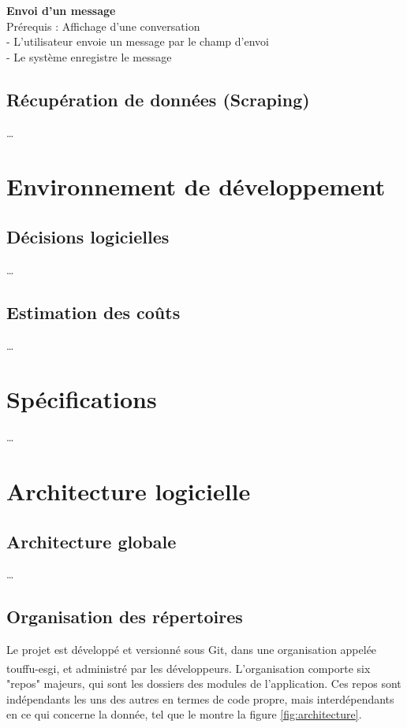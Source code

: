 \documentclass[conference]{IEEEtran}
\newcommand{\bibRef}[1]
{\textsuperscript{\cite{#1}}}
\begin{document}
\textbf{Envoi d'un message}\\
Prérequis : Affichage d'une conversation\\
- L'utilisateur envoie un message par le champ d'envoi\\
- Le système enregistre le message\\

\subsection{Récupération de données (Scraping)}
…

\section{Environnement de développement}

\subsection{Décisions logicielles}
…

\subsection{Estimation des coûts}
…

\section{Spécifications}
…

\section{Architecture logicielle}

\subsection{Architecture globale}

…

\subsection{Organisation des répertoires}

Le projet est développé et versionné sous Git, dans une organisation appelée touffu-esgi\bibRef{touffu-esgi}, et administré par les développeurs. L'organisation comporte six "repos" majeurs, qui sont les dossiers des modules de l'application. Ces repos sont indépendants les uns des autres en termes de code propre, mais interdépendants en ce qui concerne la donnée, tel que le montre la figure \ref{fig:architecture}.\\
\end{document}
